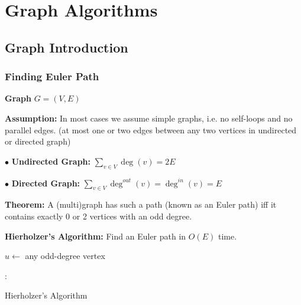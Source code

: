 \documentclass[10pt]{article}
\begin{document}
\newpage

\section{Graph Algorithms}

\subsection{Graph Introduction}

\subsubsection{Finding Euler Path}

\textbf{Graph} $G = (V, E)$

\textbf{Assumption:} In most cases we assume simple graphs, i.e. no self-loops and no parallel edges. (at most one or two edges between any two vertices in undirected or directed graph)

$\bullet$ \textbf{Undirected Graph:} $\sum_{v\in V} \deg(v) = 2E$

$\bullet$ \textbf{Directed Graph:} $\sum_{v\in V} \deg^{out}(v) = \deg^{in}(v) = E$

\textbf{Theorem:} A (multi)graph has such a path (known as an Euler path) iff it contains exactly 0 or 2 vertices with an odd degree.

\textbf{Hierholzer's Algorithm:} Find an Euler path in $O(E)$ time.
\begin{algorithm}
	\SetAlgoLined
	
	$u \gets$ any odd-degree vertex




	\vspace*{1em}

	:{


	}
	
	\caption{Hierholzer's Algorithm}
\end{algorithm}
\end{document}
